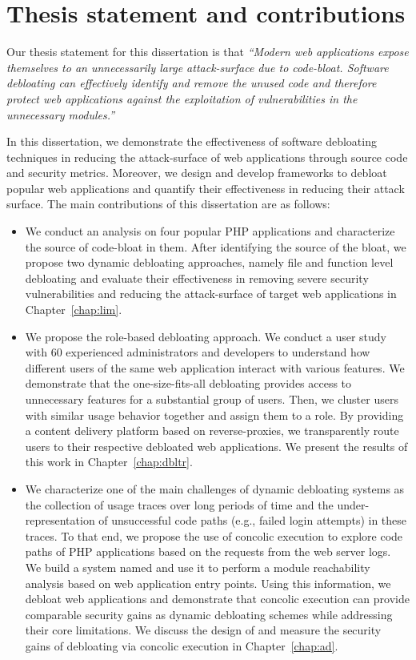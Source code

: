 \section{Thesis statement and contributions}

Our thesis statement for this dissertation is that \textit{``Modern web applications expose themselves to an unnecessarily large attack-surface due to code-bloat. Software debloating can effectively identify and remove the unused code and therefore protect web applications against the exploitation of vulnerabilities in the unnecessary modules.''}

In this dissertation, we demonstrate the effectiveness of software debloating techniques in reducing the attack-surface of web applications through source code and security metrics. 
Moreover, we design and develop frameworks to debloat popular web applications and quantify their effectiveness in reducing their attack surface. The main contributions of this dissertation are as follows:

\begin{itemize}
    \item We conduct an analysis on four popular PHP applications and characterize the source of code-bloat in them. After identifying the source of the bloat, we propose two dynamic debloating approaches, namely file and function level debloating and evaluate their effectiveness in removing severe security vulnerabilities and reducing the attack-surface of target web applications in Chapter~\ref{chap:lim}.
    \item We propose the role-based debloating approach. We conduct a user study with 60 experienced administrators and developers to understand how different users of the same web application interact with various features. We demonstrate that the one-size-fits-all debloating provides access to unnecessary features for a substantial group of users. Then, we cluster users with similar usage behavior together and assign them to a role. By providing a content delivery platform based on reverse-proxies, we transparently route users to their respective debloated web applications. We present the results of this work in Chapter~\ref{chap:dbltr}. 
    \item We characterize one of the main challenges of dynamic debloating systems as the collection of usage traces over long periods of time and the under-representation of unsuccessful code paths (e.g., failed login attempts) in these traces. To that end, we propose the use of concolic execution to explore code paths of PHP applications based on the requests from the web server logs. We build a system named \animatedead{} and use it to perform a module reachability analysis based on web application entry points. Using this information, we debloat web applications and demonstrate that concolic execution can provide comparable security gains as dynamic debloating schemes while addressing their core limitations. We discuss the design of \animatedead{} and measure the security gains of debloating via concolic execution in Chapter~\ref{chap:ad}.
\end{itemize}